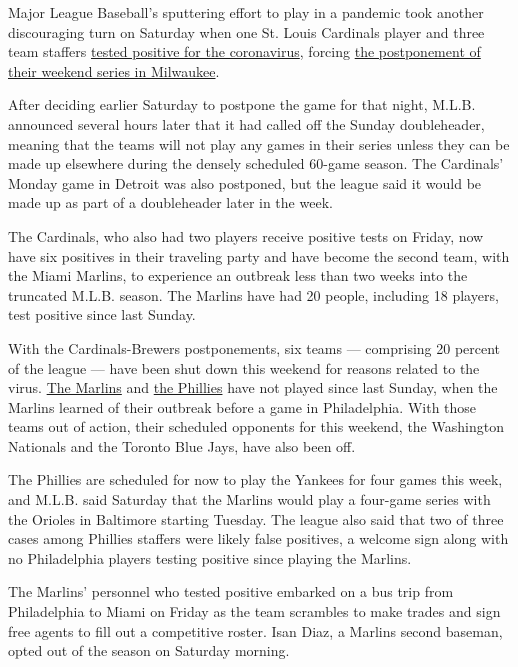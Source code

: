 Major League Baseball's sputtering effort to play in a pandemic took
another discouraging turn on Saturday when one St. Louis Cardinals
player and three team staffers
\href{https://www.nytimes.com/2020/08/03/sports/baseball/mlb-coronavirus-outbreak.html}{tested
positive for the coronavirus}, forcing
\href{https://www.nytimes.com/2020/07/31/sports/baseball/cardinals-twins-coronavirus-mlb.html}{the
postponement of their weekend series in Milwaukee}.

After deciding earlier Saturday to postpone the game for that night,
M.L.B. announced several hours later that it had called off the Sunday
doubleheader, meaning that the teams will not play any games in their
series unless they can be made up elsewhere during the densely scheduled
60-game season. The Cardinals' Monday game in Detroit was also
postponed, but the league said it would be made up as part of a
doubleheader later in the week.

The Cardinals, who also had two players receive positive tests on
Friday, now have six positives in their traveling party and have become
the second team, with the Miami Marlins, to experience an outbreak less
than two weeks into the truncated M.L.B. season. The Marlins have had 20
people, including 18 players, test positive since last Sunday.

With the Cardinals-Brewers postponements, six teams --- comprising 20
percent of the league --- have been shut down this weekend for reasons
related to the virus.
\href{https://www.nytimes.com/2020/07/28/sports/baseball/marlins-outbreak-mlb-coronavirus.html}{The
Marlins} and
\href{https://www.nytimes.com/2020/07/30/sports/baseball/phillies-blue-jays-postponed-coronavirus.html}{the
Phillies} have not played since last Sunday, when the Marlins learned of
their outbreak before a game in Philadelphia. With those teams out of
action, their scheduled opponents for this weekend, the Washington
Nationals and the Toronto Blue Jays, have also been off.

The Phillies are scheduled for now to play the Yankees for four games
this week, and M.L.B. said Saturday that the Marlins would play a
four-game series with the Orioles in Baltimore starting Tuesday. The
league also said that two of three cases among Phillies staffers were
likely false positives, a welcome sign along with no Philadelphia
players testing positive since playing the Marlins.

The Marlins' personnel who tested positive embarked on a bus trip from
Philadelphia to Miami on Friday as the team scrambles to make trades and
sign free agents to fill out a competitive roster. Isan Diaz, a Marlins
second baseman, opted out of the season on Saturday morning.

